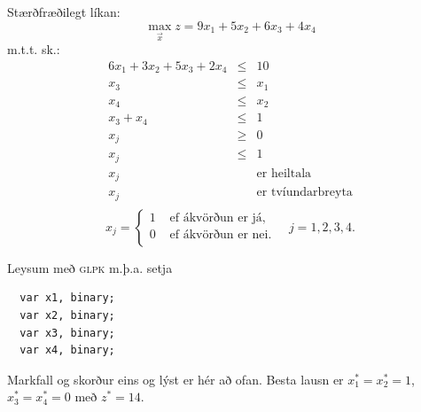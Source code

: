 \begin{lausn}Stærðfræðilegt líkan:
$$\max_\vec{x} z = 9 x_1 + 5 x_2 + 6 x_3 + 4 x_4$$
m.t.t. sk.:
\begin{eqnarray*}
  6 x_1 + 3 x_2 + 5 x_3 + 2 x_4 & \le & 10 \\
  x_3 &\le& x_1 \\
  x_4 &\le& x_2 \\
  x_3+x_4 &\le& 1\\
  x_j &\ge& 0 \\
  x_j &\le& 1 \\
  x_j & & \mbox{er heiltala} \\
  x_j & & \mbox{er tvíundarbreyta} \\
\end{eqnarray*}
\begin{equation*}
x_j = 
\begin{cases}
1 & \text{ ef ákvörðun er já,}  \\
0 & \text{ ef ákvörðun er nei.} \\
\end{cases}
\quad j=1,2,3,4.
\end{equation*}

\newpage
Leysum með \textsc{glpk} m.þ.a. setja
\begin{lstlisting}
  var x1, binary;
  var x2, binary;
  var x3, binary;
  var x4, binary;
\end{lstlisting}
Markfall og skorður eins og lýst er hér að ofan. Besta lausn er $x^*_1=x^*_2=1$, $x^*_3=x^*_4=0$ með $z^*=14$.

\end{lausn}


